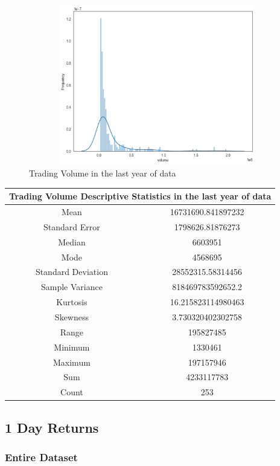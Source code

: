 \begin{figure}[h!]
\centering
\includegraphics[width=15cm,height=7cm,keepaspectratio]{resultsEvaluation/volumeDesc1.png}
\caption{Trading Volume in the last year of data}
\label{fig:appendix_volumeDesc1}
\end{figure}
\begin{center}
\begin{tabular}{ c c }
\hline
\multicolumn{2}{|c|}{Trading Volume Descriptive Statistics in the last year of data} \\
\hline
Mean & 16731690.841897232 \\
Standard Error & 1798626.81876273 \\
Median & 6603951 \\
Mode & 4568695 \\
Standard Deviation & 28552315.58314456 \\
Sample Variance & 818469783592652.2 \\
Kurtosis & 16.215823114980463 \\
Skewness & 3.730320402302758 \\
Range & 195827485 \\
Minimum & 1330461 \\
Maximum & 197157946 \\
Sum & 4233117783 \\
Count & 253
\end{tabular}
\end{center}

\subsection{1 Day Returns}

\subsubsection{Entire Dataset}

